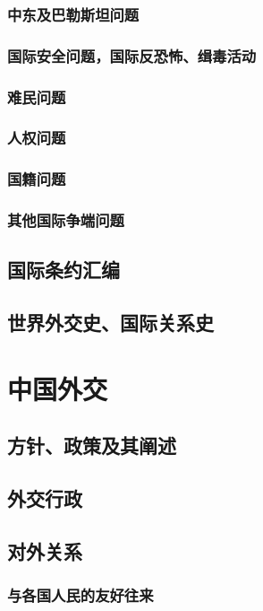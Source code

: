 \documentclass[UTF8]{../RepresentationUniverse}
\begin{document}
        \subsubsection{中东及巴勒斯坦问题}
        \subsubsection{国际安全问题，国际反恐怖、缉毒活动}
        \subsubsection{难民问题}
        \subsubsection{人权问题}
        \subsubsection{国籍问题}
        \subsubsection{其他国际争端问题}

    \subsection{国际条约汇编}
    \subsection{世界外交史、国际关系史}


\section{中国外交}
    \subsection{方针、政策及其阐述}
    \subsection{外交行政}
    \subsection{对外关系}
        \subsubsection{与各国人民的友好往来}
\end{document}
